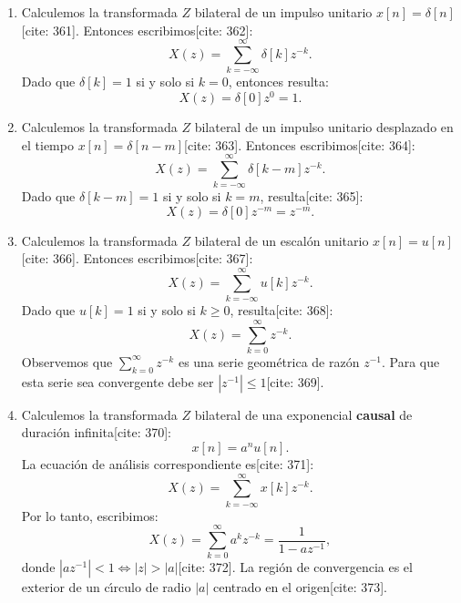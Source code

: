\documentclass[11pt,a4paper,openany]{book}
\begin{document}
\begin{enumerate}
	
	\item Calculemos la transformada $Z$ bilateral de un impulso unitario $x[n] = \delta[n]$[cite: 361]. Entonces escribimos[cite: 362]:
	\begin{equation}
		X(z) = \sum_{k=-\infty}^{\infty} \delta[k] z^{-k}.
	\end{equation}
	Dado que $\delta[k] = 1$ si y solo si $k=0$, entonces resulta:
	\begin{equation}
		X(z) = \delta[0] z^{0} = 1. 
	\end{equation}
	
	\item Calculemos la transformada $Z$ bilateral de un impulso unitario desplazado en el tiempo $x[n] = \delta[n-m]$[cite: 363]. Entonces escribimos[cite: 364]:
	\begin{equation}
		X(z) = \sum_{k=-\infty}^{\infty} \delta[k-m] z^{-k}.
	\end{equation}
	Dado que $\delta[k-m] = 1$ si y solo si $k=m$, resulta[cite: 365]:
	\begin{equation}
		X(z) = \delta[0] z^{-m} = z^{-m}.
	\end{equation}
	
	\item Calculemos la transformada $Z$ bilateral de un escal\'{o}n unitario $x[n] = u[n]$[cite: 366]. Entonces escribimos[cite: 367]:
	\begin{equation}
		X(z) = \sum_{k=-\infty}^{\infty} u[k] z^{-k}.
	\end{equation}
	Dado que $u[k] = 1$ si y solo si $k \geq 0$, resulta[cite: 368]:
	\begin{equation}
		X(z) = \sum_{k=0}^{\infty} z^{-k}.
	\end{equation}
	Observemos que $\sum_{k=0}^{\infty} z^{-k}$ es una serie geom\'{e}trica de raz\'{o}n $z^{-1}$. Para que esta serie sea convergente debe ser $|z^{-1}| \leq 1$[cite: 369].
	
	\item Calculemos la transformada $Z$ bilateral de una exponencial \textbf{causal} de duraci\'{o}n infinita[cite: 370]:
	\begin{equation}
		x[n] = a^{n} u[n].
	\end{equation}
	La ecuaci\'{o}n de an\'{a}lisis correspondiente es[cite: 371]:
	\begin{equation}
		X(z) = \sum_{k=-\infty}^{\infty} x[k] z^{-k}.
	\end{equation}
	Por lo tanto, escribimos:
	\begin{equation}
		X(z) = \sum_{k=0}^{\infty} a^k z^{-k} = \frac{1}{1-a z^{-1}},
	\end{equation}
	donde $|a z^{-1}| < 1 \Leftrightarrow |z| > |a|$[cite: 372].
	La regi\'{o}n de convergencia es el exterior de un c\'{\i}rculo de radio $|a|$ centrado en el origen[cite: 373].
	
\end{enumerate}
\end{document}
